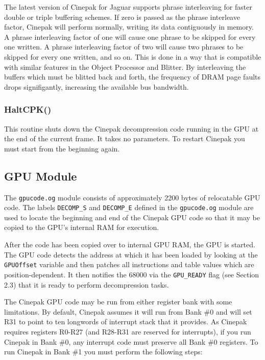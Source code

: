 \documentclass[12pt,letterpaper,twoside]{article}
\begin{document}
The latest version of Cinepak for Jaguar supports phrase interleaving for faster double or triple buffering schemes. If zero is passed as the phrase interleave factor, Cinepak will perform normally, writing its data contiguously in memory. A phrase interleaving factor of one will cause one phrase to be skipped for every one written. A phrase interleaving factor of two will cause two phrases to be skipped for every one written, and so on. This is done in a way that is compatible with similar features in the Object Processor and Blitter. By interleaving the buffers which must be blitted back and forth, the frequency of DRAM page faults drops signifigantly, increasing the available bus bandwidth.

\subsubsection{HaltCPK()}
This routine shuts down the Cinepak decompression code running in the GPU at the end of the current frame. It takes no parameters. To restart Cinepak you must start from the beginning again.

\subsection{GPU Module}
The \texttt{gpucode.og} module consists of approximately 2200 bytes of relocatable GPU code. The labels \texttt{DECOMP\_S} and \texttt{DECOMP\_E} defined in the \texttt{gpucode.og} module are used to locate the beginning and end of the Cinepak GPU code so that it may be copied to the GPU's internal RAM for execution.

After the code has been copied over to internal GPU RAM, the GPU is started. The GPU code detects the address at which it has been loaded by looking at the \texttt{GPUOffset} variable and then patches all instructions and table values which are position-dependent. It then notifies the 68000 via the \texttt{GPU\_READY} flag (see Section 2.3) that it is ready to perform decompression tasks.

The Cinepak GPU code may be run from either register bank with some limitations. By default, Cinepak assumes it will run from Bank \#0 and will set R31 to point to ten longwords of interrupt stack that it provides. As Cinepak requires registers R0-R27 (and R28-R31 are reserved for interrupts), if you run Cinepak in Bank \#0, any interrupt code must preserve all Bank \#0 registers. To run Cinepak in Bank \#1 you must perform the following steps:
\end{document}
